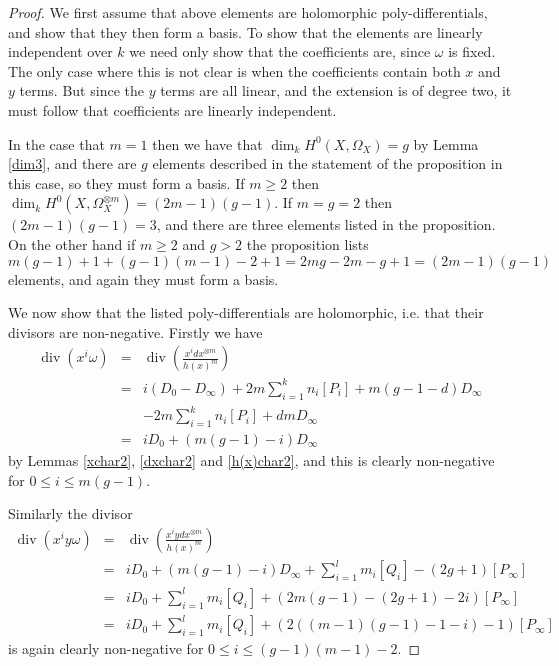 \documentclass[draft, 11pt]{article} %
\theoremstyle{plain}
\theoremstyle{remark}
\DeclareMathOperator{\di}{div}
\begin{document}
\begin{proof}
 We first assume that above elements are holomorphic poly-differentials, and show that they then form a basis.
To show that the elements are linearly independent over $k$ we need only show that the coefficients are, since $\omega$ is fixed.
The only case where this is not clear is when the coefficients contain both $x$ and $y$ terms.
But since the $y$ terms are all linear, and the extension is of degree two, it must follow that coefficients are linearly independent.
 
 
 In the case that $m=1$ then we have that $\dim_k H^0(X,\Omega_X) =g$ by Lemma \ref{dim3}, and there are $g$ elements described in the statement of the proposition in this case, so they must form a basis.
 If $m \geq 2$ then $\dim_k H^0(X,\Omega_X^{\otimes m}) = (2m-1)(g-1)$.
 If $m=g=2$ then $(2m-1)(g-1) = 3$, and there are three elements listed in the proposition.
 On the other hand if $m\geq 2$ and $g > 2$ the proposition lists
 \[
  m(g-1)+1 + (g-1)(m-1)-2+1 = 2mg -2m -g +1 = (2m-1)(g-1)
 \]
 elements, and again they must form a basis.
 
 We now show that the listed poly-differentials are holomorphic, i.e. that their divisors are non-negative.
 Firstly we have
 \begin{eqnarray*}
  \di(x^i\omega) & = & \di \left( \frac{x^i dx^{\otimes m}}{h(x)^m} \right)\\ & = & i(D_0 - D_\infty) +2m\sum_{i=1}^k n_i[P_i] + m(g-1-d)D_\infty\\
  & & -2m\sum_{i=1}^k n_i [P_i] + dmD_\infty \\
  & = & iD_0 + (m(g-1) -i)D_\infty
 \end{eqnarray*}
  by Lemmas \ref{xchar2}, \ref{dxchar2} and \ref{h(x)char2}, and this is clearly non-negative for $0\leq i \leq m(g-1)$.
  
  Similarly the divisor 
  \begin{eqnarray*}
   \di(x^iy\omega) & = & \di \left( \frac{x^i ydx^{\otimes m}}{h(x)^m} \right)\\ & = & iD_0 + (m(g-1) -i)D_\infty + \sum_{i=1}^l m_i[Q_i] - (2g+1)[P_\infty] \\
    & = & iD_0 +  \sum_{i=1}^l m_i[Q_i] + (2m(g-1) -(2g+1) -2i)[P_\infty] \\
   & = & iD_0 +  \sum_{i=1}^l m_i[Q_i] + (2((m-1)(g-1) -1 -i)-1)[P_\infty]
  \end{eqnarray*}
 is again clearly non-negative for $0 \leq i \leq (g-1)(m-1)-2$.

  \end{proof}
\end{document}
